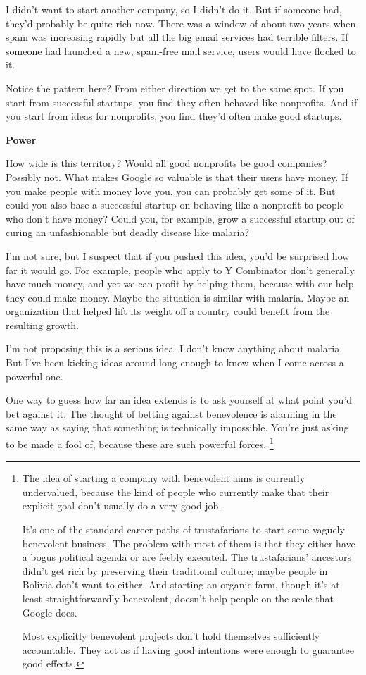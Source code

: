 I didn't want to start another company, so I didn't do it. But if
someone had, they'd probably be quite rich now. There was a window of
about two years when spam was increasing rapidly but all the big email
services had terrible filters. If someone had launched a new, spam-free
mail service, users would have flocked to it.

Notice the pattern here? From either direction we get to the same spot.
If you start from successful startups, you find they often behaved like
nonprofits. And if you start from ideas for nonprofits, you find they'd
often make good startups.

\textbf{Power}

How wide is this territory? Would all good nonprofits be good companies?
Possibly not. What makes Google so valuable is that their users have
money. If you make people with money love you, you can probably get some
of it. But could you also base a successful startup on behaving like a
nonprofit to people who don't have money? Could you, for example, grow a
successful startup out of curing an unfashionable but deadly disease
like malaria?

I'm not sure, but I suspect that if you pushed this idea, you'd be
surprised how far it would go. For example, people who apply to Y
Combinator don't generally have much money, and yet we can profit by
helping them, because with our help they could make money. Maybe the
situation is similar with malaria. Maybe an organization that helped
lift its weight off a country could benefit from the resulting growth.

I'm not proposing this is a serious idea. I don't know anything about
malaria. But I've been kicking ideas around long enough to know when I
come across a powerful one.

One way to guess how far an idea extends is to ask yourself at what
point you'd bet against it. The thought of betting against benevolence
is alarming in the same way as saying that something is technically
impossible. You're just asking to be made a fool of, because these are
such powerful forces. \footnote{The idea of starting a company with benevolent aims is currently
undervalued, because the kind of people who currently make that their
explicit goal don't usually do a very good job.

It's one of the standard career paths of trustafarians to start some
vaguely benevolent business. The problem with most of them is that they
either have a bogus political agenda or are feebly executed. The
trustafarians' ancestors didn't get rich by preserving their traditional
culture; maybe people in Bolivia don't want to either. And starting an
organic farm, though it's at least straightforwardly benevolent, doesn't
help people on the scale that Google does.

Most explicitly benevolent projects don't hold themselves sufficiently
accountable. They act as if having good intentions were enough to
guarantee good effects.}

